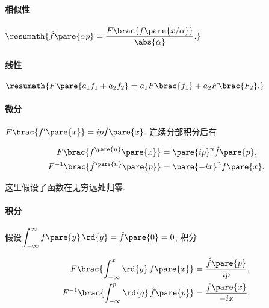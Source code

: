 \documentclass[hidelinks]{ctexart}
\begin{document}

\paragraph{相似性} %
\label{par:相似性}

$\displaystyle \resumath{\hat f\pare{\alpha p} = \frac{F\brac{f\pare{x/\alpha}}}{\abs{\alpha}}.}$


\paragraph{线性} %
\label{par:线性}

$\displaystyle \resumath{F\pare{a_1f_1+a_2f_2} = a_1F\brac{f_1} + a_2F\brac{F_2}.}$


\paragraph{微分} %
\label{par:微分}

$F\brac{f'\pare{x}} = ip\hat f\pare{x}.$ 连续分部积分后有
\begin{resume}
\vspace{-\baselineskip}
\begin{align*}
    F\brac{f^{\pare{n}}\pare{x}} &= \pare{ip}^n \hat f\pare{p}, \\
    F^{-1}\brac{\hat f^{\pare{n}}\pare{p}} &= \pare{-ix}^nf\pare{x}.
\end{align*}
\end{resume}
这里假设了函数在无穷远处归零.


\paragraph{积分} %
\label{par:积分}

假设$\displaystyle \int_{-\infty}^\infty f\pare{y}\,\rd{y} = \hat f\pare{0} = 0$, 积分
\begin{resume}
\vspace{-\baselineskip}
\begin{align*}
    F\brac{\int_{-\infty}^x \rd{y}\, f\pare{x}} &= \frac{\hat f\pare{p}}{ip}, \\
    F^{-1}\brac{\int_{-\infty}^p \rd{q}\, \hat f\pare{p}} &= \frac{f\pare{x}}{-ix}.
\end{align*}
\end{resume}
\end{document}
